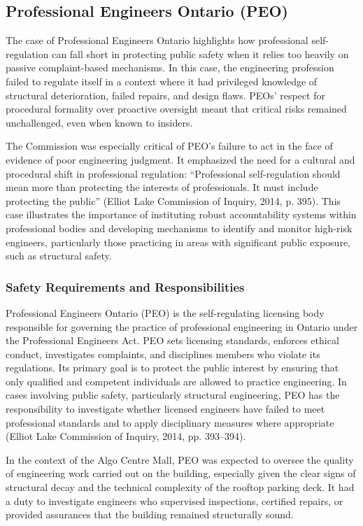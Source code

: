 \documentclass[12pt]{article}
\begin{document}
\subsection{Professional Engineers Ontario (PEO)}
The case of Professional Engineers Ontario highlights how professional self-regulation can fall short in protecting public safety when it relies too heavily on passive complaint-based mechanisms. In this case, the engineering profession failed to regulate itself in a context where it had privileged knowledge of structural deterioration, failed repairs, and design flaws. PEOs’ respect for procedural formality over proactive oversight meant that critical risks remained unchallenged, even when known to insiders.

The Commission was especially critical of PEO’s failure to act in the face of evidence of poor engineering judgment. It emphasized the need for a cultural and procedural shift in professional regulation: “Professional self-regulation should mean more than protecting the interests of professionals. It must include protecting the public” (Elliot Lake Commission of Inquiry, 2014, p. 395). This case illustrates the importance of instituting robust accountability systems within professional bodies and developing mechanisms to identify and monitor high-risk engineers, particularly those practicing in areas with significant public exposure, such as structural safety.

\subsubsection*{Safety Requirements and Responsibilities}
Professional Engineers Ontario (PEO) is the self-regulating licensing body responsible for governing the practice of professional engineering in Ontario under the Professional Engineers Act. PEO sets licensing standards, enforces ethical conduct, investigates complaints, and disciplines members who violate its regulations. Its primary goal is to protect the public interest by ensuring that only qualified and competent individuals are allowed to practice engineering. In cases involving public safety, particularly structural engineering, PEO has the responsibility to investigate whether licensed engineers have failed to meet professional standards and to apply disciplinary measures where appropriate (Elliot Lake Commission of Inquiry, 2014, pp. 393–394).

In the context of the Algo Centre Mall, PEO was expected to oversee the quality of engineering work carried out on the building, especially given the clear signs of structural decay and the technical complexity of the rooftop parking deck. It had a duty to investigate engineers who supervised inspections, certified repairs, or provided assurances that the building remained structurally sound.
\end{document}
